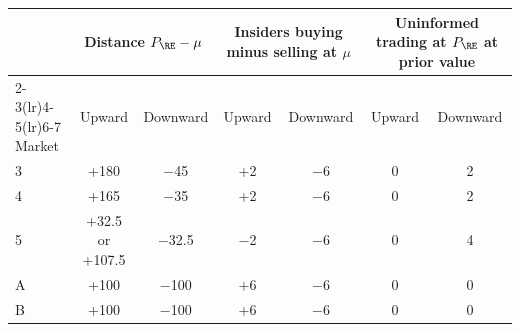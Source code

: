 \begin{tabular}{lcccccc}
\toprule
 & \multicolumn{2}{c}{Distance $P_{\RE}-\mu$} & \multicolumn{2}{c}{Insiders buying minus selling at $\mu$} & \multicolumn{2}{c}{Uninformed trading at $P_{\RE}$ at prior value} \\
\cmidrule(lr){2-3}\cmidrule(lr){4-5}\cmidrule(lr){6-7}
Market & Upward & Downward & Upward & Downward & Upward & Downward \\
\midrule
3 & +180 & $-$45 & +2 & $-$6 & 0 & 2 \\
4 & +165 & $-$35 & +2 & $-$6 & 0 & 2 \\
5 & +32.5 or +107.5 & $-$32.5 & $-$2 & $-$6 & 0 & 4 \\
A & +100 & $-$100 & +6 & $-$6 & 0 & 0 \\
B & +100 & $-$100 & +6 & $-$6 & 0 & 0 \\
\bottomrule
\end{tabular}
